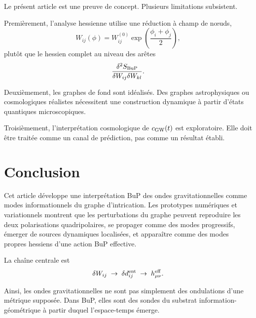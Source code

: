 \documentclass[11pt,a4paper]{article}
\begin{document}
Le présent article est une preuve de concept. Plusieurs limitations subsistent.

Premièrement, l'analyse hessienne utilise une réduction à champ de nœuds,
\[
W_{ij}(\phi) = W_{ij}^{(0)} \exp\left(\frac{\phi_i + \phi_j}{2}\right),
\]
plutôt que le hessien complet au niveau des arêtes
\[
\frac{\delta^2 S_{\rm BuP}}{\delta W_{ij} \delta W_{kl}}.
\]

Deuxièmement, les graphes de fond sont idéalisés. Des graphes astrophysiques ou
cosmologiques réalistes nécessitent une construction dynamique à partir d'états
quantiques microscopiques.

Troisièmement, l'interprétation cosmologique de \(c_{\rm GW}(t)\) est exploratoire.
Elle doit être traitée comme un canal de prédiction, pas comme un résultat établi.

\section{Conclusion}

Cet article développe une interprétation BuP des ondes gravitationnelles comme
modes informationnels du graphe d'intrication. Les prototypes numériques et
variationnels montrent que les perturbations du graphe peuvent reproduire les
deux polarisations quadripolaires, se propager comme des modes progressifs,
émerger de sources dynamiques localisées, et apparaître comme des modes propres
hessiens d'une action BuP effective.

La chaîne centrale est
\[
\delta W_{ij}
\;\rightarrow\;
\delta d_{ij}^{\rm ent}
\;\rightarrow\;
h_{\mu\nu}^{\rm eff}.
\]

Ainsi, les ondes gravitationnelles ne sont pas simplement des ondulations d'une
métrique supposée. Dans BuP, elles sont des sondes du substrat
information-géométrique à partir duquel l'espace-temps émerge.
\end{document}

